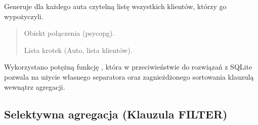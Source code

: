 \documentclass[a4paper,11pt,english,openany,oneside]{sphinxmanual}
\begin{document}
\begin{savenotes}\begin{fulllineitems}

\pysigstartsignatures
\pysiglinewithargsret
{}
{}
{}
\pysigstopsignatures
\sphinxAtStartPar
Generuje dla każdego auta czytelną listę wszystkich klientów, którzy go wypożyczyli.
\begin{quote}\begin{description}
\sphinxAtStartPar
{} \textendash{} Obiekt połączenia (psycopg).

\sphinxAtStartPar
Lista krotek (Auto, lista klientów).

\end{description}\end{quote}

\sphinxAtStartPar
{} Wykorzystano potężną funkcję , która w przeciwieństwie do rozwiązań z SQLite pozwala na użycie własnego separatora oraz zagnieżdżonego sortowania klauzulą  wewnątrz agregacji.

\end{fulllineitems}\end{savenotes}



\subsection{Selektywna agregacja (Klauzula FILTER)}
\label{\detokenize{rozdzial_5/index:selektywna-agregacja-klauzula-filter}}
\end{document}
